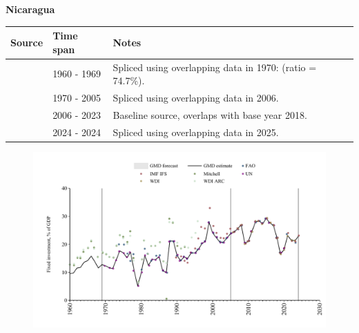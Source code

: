 \documentclass[12pt,a4paper,landscape]{article}
\begin{document}
\begin{adjustbox}{max totalsize={\paperwidth}{\paperheight},center}
\begin{minipage}[t][\textheight][t]{\textwidth}
\vspace*{0.5cm}
{}
\begin{center}
{\Large\bfseries Nicaragua}
\end{center}
\vspace{0.5cm}
\begin{table}[H]
\centering
\small
\begin{tabular}{|l|l|l|}
\hline
\textbf{Source} & \textbf{Time span} & \textbf{Notes} \\
\hline
\rowcolor{white}\cite{WDI_ARC}& 1960 - 1969 &Spliced using overlapping data in 1970: (ratio = 74.7\%).\\
\rowcolor{lightgray}\cite{UN}& 1970 - 2005 &Spliced using overlapping data in 2006.\\
\rowcolor{white}\cite{WDI}& 2006 - 2023 &Baseline source, overlaps with base year 2018.\\
\rowcolor{lightgray}\cite{IMF_IFS}& 2024 - 2024 &Spliced using overlapping data in 2025.\\
\hline
\end{tabular}
\end{table}
\begin{figure}[H]
\centering
\includegraphics[width=\textwidth,height=0.6\textheight,keepaspectratio]{graphs/NIC_finv_GDP.pdf}
\end{figure}
\end{minipage}
\end{adjustbox}
\end{document}
